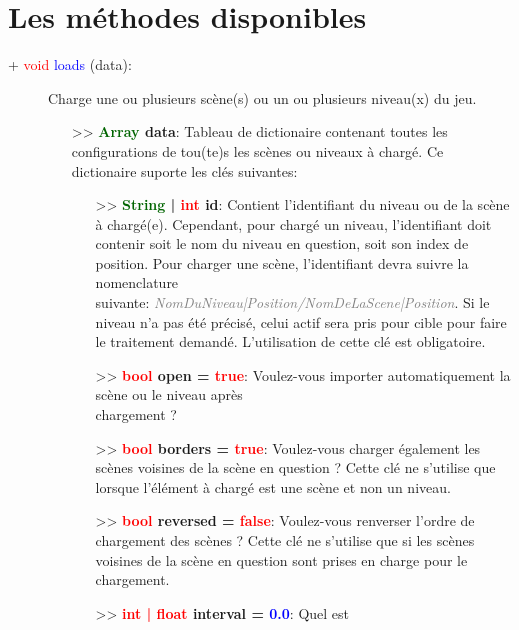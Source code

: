 \documentclass[a4paper, 11pt]{article}
\begin{document}
	\section{Les méthodes disponibles}
	\begin{description}
		\item [+ \textcolor{red}{void} \textcolor{blue}{\hypertarget{load}{loads}} (data):] Charge une ou 
		plusieurs scène(s) ou un ou plusieurs niveau(x) du jeu.
		\begin{itemize}
			\item [>> \textbf{\textcolor{darkgreen}{Array} data}:] Tableau de dictionaire contenant toutes 
			les configurations de tou(te)s les scènes ou niveaux à chargé. Ce dictionaire suporte les clés 
			suivantes:
			\begin{itemize}
				\item[>> \textbf{\textcolor{darkgreen}{String} | \textcolor{red}{int} id}:] Contient
				l'identifiant du niveau ou de la scène à chargé(e). Cependant, pour chargé un niveau,
				l'identifiant doit contenir soit le nom du niveau en question, soit son index de position. 
				Pour charger une scène, l'identifiant devra suivre la nomenclature \\suivante: 
				\textit{\textcolor{gray}{NomDuNiveau|Position/NomDeLaScene|Position}}. Si le niveau n'a pas 
				été précisé, celui actif sera pris pour cible pour faire le traitement demandé. 
				L'utilisation de cette clé est obligatoire.\\
				\item[>> \textbf{\textcolor{red}{bool} open = \textcolor{red}{true}}:] Voulez-vous importer 
				automatiquement la scène ou le niveau après \\chargement ?\\
				\item[>> \textbf{\textcolor{red}{bool} borders = \textcolor{red}{true}}:] Voulez-vous 
				charger également les scènes voisines de la scène en question ? Cette clé ne s'utilise que 
				lorsque l'élément à chargé est une scène et non un niveau.\\
				\item[>> \textbf{\textcolor{red}{bool} reversed = \textcolor{red}{false}}:] Voulez-vous 
				renverser l'ordre de chargement des scènes ? Cette clé ne s'utilise que si les scènes 
				voisines de la scène en question sont prises en charge pour le chargement.\\
				\item[>> \textbf{\textcolor{red}{int | float} interval = \textcolor{blue}{0.0}}:] Quel est 

\end{itemize}
\end{itemize}
\end{description}
\end{document}
